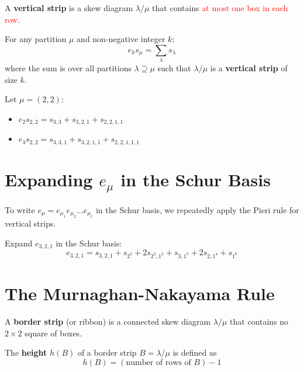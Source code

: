 \documentclass[12pt]{memoir}
\begin{document}
\begin{ptcb}
\begin{Def}
A \textbf{vertical strip} is a skew diagram $\lambda / \mu$ that contains \textcolor{red}{at most one box in each row}.
\end{Def}
\end{ptcb}

\begin{ptcb}
\begin{Th}
For any partition $\mu$ and non-negative integer $k$:
\[
e_k s_\mu = \sum_{\lambda} s_\lambda
\]
where the sum is over all partitions $\lambda \supseteq \mu$ such that $\lambda / \mu$ is a \textbf{vertical strip} of size $k$.
\end{Th}
\end{ptcb}

\begin{Ex}
Let $\mu = (2,2)$:
\begin{itemize}
    \item $e_2 s_{2,2} = s_{3,3} + s_{3,2,1} + s_{2,2,1,1}$
    \item $e_3 s_{2,2} = s_{3,3,1} + s_{3,2,1,1} + s_{2,2,1,1,1}$
\end{itemize}
\end{Ex}

\newpage

\section{Expanding \texorpdfstring{$e_\mu$}{e_{\mu}} in the Schur Basis}

\begin{ptcb}
To write $e_\mu = e_{\mu_1} e_{\mu_2} \dots e_{\mu_\ell}$ in the Schur basis, we repeatedly apply the Pieri rule for vertical strips.
\end{ptcb}

\begin{Ex}
Expand $e_{3,2,1}$ in the Schur basis:
\[
e_{3,2,1} = s_{3,2,1} + s_{2^3} + 2 s_{2^2,1^2} + s_{3,1^3} + 2 s_{2,1^4} + s_{1^6}
\]
\end{Ex}

\newpage

\section{The Murnaghan-Nakayama Rule}

\begin{ptcb}
\begin{Def}
A \textbf{border strip} (or ribbon) is a connected skew diagram $\lambda / \mu$ that contains no $2 \times 2$ square of boxes.

The \textbf{height} $h(B)$ of a border strip $B = \lambda / \mu$ is defined as
\[
h(B) = (\text{number of rows of } B) - 1
\]
\end{Def}
\end{ptcb}
\end{document}
